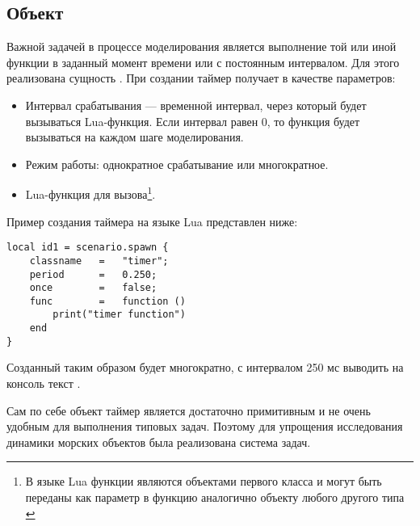 %

\subsection{Объект }

Важной задачей в процессе моделирования является выполнение той или иной функции в заданный момент времени или с постоянным интервалом. Для этого реализована сущность . При создании таймер получает в качестве параметров:
\begin{itemize}
	\item	Интервал срабатывания --- временной интервал, через который 
			будет вызываться Lua-функция. Если интервал равен $0$, 
			то функция будет вызываться на каждом шаге моделирования.
	\item	Режим работы: однократное срабатывание или многократное.
	\item	Lua-функция для вызова\footnote{В языке Lua функции являются 
			объектами первого класса и могут быть переданы как параметр 
			в функцию аналогично объекту любого другого типа \citep{implua}}.
\end{itemize}

Пример создания таймера на языке Lua представлен ниже:

\begin{lstlisting}[caption={Пример создания таймера}]
local id1 = scenario.spawn {
    classname   =   "timer";
    period      =   0.250;         
    once        =   false;      
    func        =   function () 
        print("timer function")
    end
}
\end{lstlisting}

Созданный таким образом  будет многократно, с интервалом 250 мс выводить на консоль текст .

Сам по себе объект таймер является достаточно примитивным и не очень удобным для выполнения типовых задач. 
Поэтому для упрощения исследования динамики морских объектов была реализована система задач.

